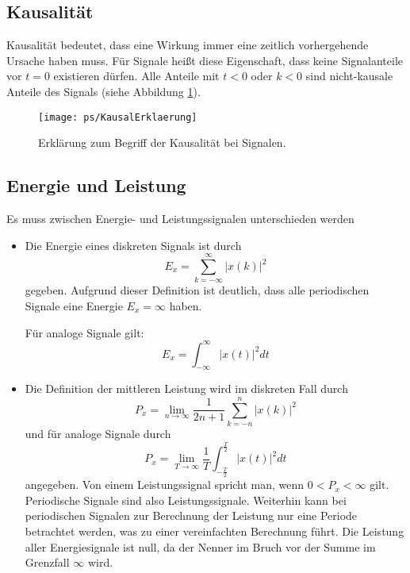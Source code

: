 \subsection{Kausalität}
Kausalität bedeutet, dass eine Wirkung immer eine zeitlich vorhergehende Ursache haben muss.
Für Signale heißt diese Eigenschaft, dass keine Signalanteile vor $t = 0$ existieren dürfen.
Alle Anteile mit $t<0$ oder $k < 0$ sind nicht-kausale Anteile des Signals (siehe Abbildung
\ref{pic:KausalErklaerung}).

\begin{figure}[h]
\begin{center}
\texttt{[image: ps/KausalErklaerung]}
\caption{\label{pic:KausalErklaerung} Erklärung zum Begriff der Kausalität bei Signalen.}
\end{center}
\end{figure}

\subsection{Energie und Leistung \label{sec:EnergUndLeistung}}
Es muss zwischen Energie- und Leistungssignalen unterschieden werden
\begin{itemize}
\item{Die Energie eines diskreten Signals ist durch
\begin{equation}
    E_x = \sum_{k = -\infty}^{\infty} |x(k)|^2
\end{equation}
gegeben. Aufgrund dieser Definition ist deutlich, dass alle periodischen Signale
eine Energie $E_x=\infty$ haben.

Für analoge Signale gilt:
\begin{equation}
    E_x = \int_{-\infty}^{\infty} |x(t)|^2 dt
\end{equation}
}
\item{Die Definition der mittleren Leistung wird im diskreten Fall durch
\begin{equation}
    P_x =\lim_{n\rightarrow \infty} \frac{1}{2n+1} \sum_{k = -n}^{n} |x(k)|^2
\end{equation}
und für analoge Signale durch
\begin{equation}
    P_x =\lim_{T\rightarrow \infty} \frac{1}{T} \int_{-\frac{T}{2}}^{\frac{T}{2}} |x(t)|^2 dt
\end{equation}
angegeben. Von einem Leistungssignal spricht man, wenn $0 < P_x < \infty$ gilt.
Periodische Signale sind also Leistungssignale. Weiterhin kann bei periodischen Signalen
zur Berechnung der Leistung
nur eine Periode betrachtet werden, was zu einer vereinfachten Berechnung führt.
Die Leistung aller Energiesignale ist null, da der Nenner im Bruch vor der Summe im Grenzfall $\infty$ wird.
}
\end{itemize}

